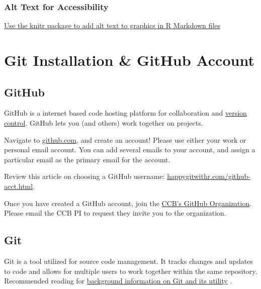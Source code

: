 \documentclass[
]{book}
\begin{document}
\hypertarget{alt-text-for-accessibility}{%
\subsection{Alt Text for Accessibility}\label{alt-text-for-accessibility}}

\href{https://www.rstudio.com/blog/knitr-fig-alt/}{Use the knitr package to add alt text to graphics in R Markdown files}

\hypertarget{git}{%
\chapter{Git Installation \& GitHub Account}\label{git}}

\hypertarget{github}{%
\section{GitHub}\label{github}}

GitHub is a internet based code hosting platform for collaboration and \href{https://www.atlassian.com/git/tutorials/what-is-version-control\#:~:text=Version\%20control\%2C\%20also\%20known\%20as,to\%20source\%20code\%20over\%20time.}{version control}. GitHub lets you (and others) work together on projects.

Navigate to \href{https://github.com/}{github.com}, and create an account! Please use either your work or personal email account. You can add several emails to your account, and assign a particular email as the primary email for the account.

Review this article on choosing a GitHub username: \url{happygitwithr.com/github-acct.html}.

Once you have created a GitHub account, join the \href{https://github.com/ccbucr}{CCB's GitHub Organization}. Please email the CCB PI to request they invite you to the organization.

\hypertarget{git-1}{%
\section{Git}\label{git-1}}

Git is a tool utilized for source code management. It tracks changes and updates to code and allows for multiple users to work together within the same repository. Recommended reading for \href{https://towardsdatascience.com/what-is-git-and-why-is-it-so-important-dce559b27833}{background information on Git and its utility} \citep{Yıldırım_2020}.
\end{document}
